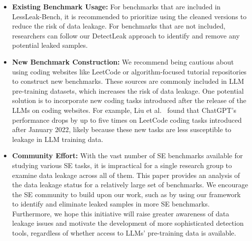 \begin{itemize}[leftmargin=*]
    \item \textbf{Existing Benchmark Usage:} 
    For benchmarks that are included in LessLeak-Bench, it is recommended to prioritize using the cleaned versions to reduce the risk of data leakage. For benchmarks that are not included, researchers can follow our DetectLeak approach to identify and remove any potential leaked samples.
    
    
    \item \textbf{New Benchmark Construction:} 
    We recommend being cautious about using coding websites like LeetCode or algorithm-focused tutorial repositories to construct new benchmarks. These sources are commonly included in LLM pre-training datasets, which increases the risk of data leakage.   
    One potential solution is to incorporate new coding tasks introduced after the release of the LLMs on coding websites. For example, Liu et al.~\cite{DBLP:journals/tosem/LiuLWTLLL24} found that ChatGPT’s performance drops by up to five times on LeetCode coding tasks introduced after January 2022, likely because these new tasks are less susceptible to leakage in LLM training data.
 

    
    \item \textbf{Community Effort:}
    With the vast number of SE benchmarks available for studying various SE tasks, it is impractical for a single research group to examine data leakage across all of them. This paper provides an analysis of the data leakage status for a relatively large set of benchmarks. We encourage the SE community to build upon our work, such as by using our framework to identify and eliminate leaked samples in more SE benchmarks. Furthermore, we hope this initiative will raise greater awareness of data leakage issues and motivate the development of more sophisticated detection tools, regardless of whether access to LLMs’ pre-training data is available.
\end{itemize}









